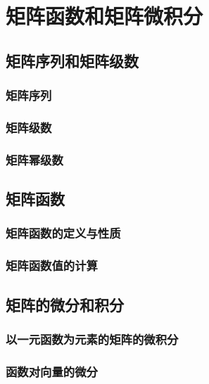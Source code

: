 \chapter{矩阵函数和矩阵微积分}
\label{cha:矩阵函数和矩阵微积分}

\section{矩阵序列和矩阵级数}
\label{sec:矩阵序列和矩阵级数}

\subsection{矩阵序列}
\label{sub:矩阵序列}

\subsection{矩阵级数}
\label{sub:矩阵级数}

\subsection{矩阵幂级数}
\label{sub:矩阵幂级数}

\section{矩阵函数}
\label{sec:矩阵函数}

\subsection{矩阵函数的定义与性质}
\label{sub:矩阵函数的定义与性质}

\subsection{矩阵函数值的计算}
\label{sub:矩阵函数值的计算}

\section{矩阵的微分和积分}
\label{sec:矩阵的微分和积分}

\subsection{以一元函数为元素的矩阵的微积分}
\label{sub:以一元函数为元素的矩阵的微积分}

\subsection{函数对向量的微分}
\label{sub:函数对向量的微分}


